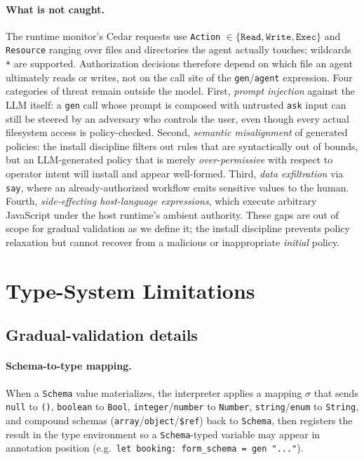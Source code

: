 \begin{sloppypar}
\paragraph{What is not caught.} The runtime monitor's Cedar requests use
\texttt{Action} $\in \{\texttt{Read}, \texttt{Write}, \texttt{Exec}\}$ and
\texttt{Resource} ranging over files and directories the agent actually touches;
wildcards \texttt{*} are supported. Authorization decisions therefore depend on
which file an agent ultimately reads or writes, not on the call site of the
\texttt{gen}/\texttt{agent} expression. Four categories of threat remain outside
the model. First, \emph{prompt injection} against the LLM itself: a \texttt{gen}
call whose prompt is composed with untrusted \texttt{ask} input can still be
steered by an adversary who controls the user, even though every actual
filesystem access is policy-checked. Second, \emph{semantic misalignment} of
generated policies: the install discipline filters out rules that are
syntactically out of bounds, but an LLM-generated policy that is merely
\emph{over-permissive} with respect to operator intent will install and appear
well-formed. Third, \emph{data exfiltration} via \texttt{say}, where an
already-authorized workflow emits sensitive values to the human. Fourth,
\emph{side-effecting host-language expressions}, which execute arbitrary
JavaScript under the host runtime's ambient authority. These gaps are out of
scope for gradual validation as we define it; the install discipline prevents
policy relaxation but cannot recover from a malicious or inappropriate
\emph{initial} policy.  \end{sloppypar}

\section{Type-System Limitations}
\label{app:limitations}

\subsection{Gradual-validation details}
\label{app:gradual-detail}

\paragraph{Schema-to-type mapping.} When a \texttt{Schema} value materializes,
the interpreter applies a mapping $\sigma$ that sends \texttt{null} to
\texttt{()}, \texttt{boolean} to \texttt{Bool}, \texttt{integer}/\texttt{number}
to \texttt{Number}, \texttt{string}/\texttt{enum} to \texttt{String}, and
compound schemas (\texttt{array}/\texttt{object}/\texttt{\$ref}) back to
\texttt{Schema}, then registers the result in the type environment so a
\texttt{Schema}-typed variable may appear in annotation position (e.g.\
\texttt{let booking: form\_schema = gen "..."}).

